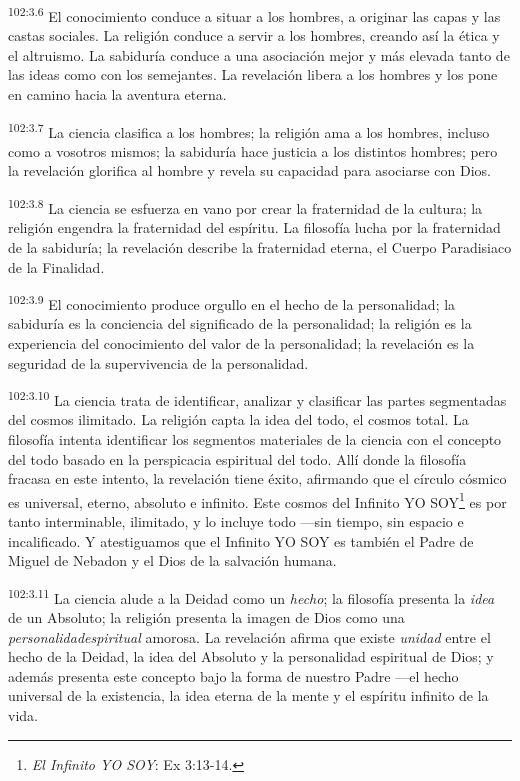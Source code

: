 \par
\textsuperscript{102:3.6} El conocimiento conduce a situar a los hombres, a originar las capas y las castas sociales. La religión conduce a servir a los hombres, creando así la ética y el altruismo. La sabiduría conduce a una asociación mejor y más elevada tanto de las ideas como con los semejantes. La revelación libera a los hombres y los pone en camino hacia la aventura eterna.

\par
\textsuperscript{102:3.7} La ciencia clasifica a los hombres; la religión ama a los hombres, incluso como a vosotros mismos; la sabiduría hace justicia a los distintos hombres; pero la revelación glorifica al hombre y revela su capacidad para asociarse con Dios.

\par
\textsuperscript{102:3.8} La ciencia se esfuerza en vano por crear la fraternidad de la cultura; la religión engendra la fraternidad del espíritu. La filosofía lucha por la fraternidad de la sabiduría; la revelación describe la fraternidad eterna, el Cuerpo Paradisiaco de la Finalidad.

\par
\textsuperscript{102:3.9} El conocimiento produce orgullo en el hecho de la personalidad; la sabiduría es la conciencia del significado de la personalidad; la religión es la experiencia del conocimiento del valor de la personalidad; la revelación es la seguridad de la supervivencia de la personalidad.

\par
\textsuperscript{102:3.10} La ciencia trata de identificar, analizar y clasificar las partes segmentadas del cosmos ilimitado. La religión capta la idea del todo, el cosmos total. La filosofía intenta identificar los segmentos materiales de la ciencia con el concepto del todo basado en la perspicacia espiritual del todo. Allí donde la filosofía fracasa en este intento, la revelación tiene éxito, afirmando que el círculo cósmico es universal, eterno, absoluto e infinito. Este cosmos del Infinito YO SOY\footnote{\textit{El Infinito YO SOY}: Ex 3:13-14.} es por tanto interminable, ilimitado, y lo incluye todo ---sin tiempo, sin espacio e incalificado. Y atestiguamos que el Infinito YO SOY es también el Padre de Miguel de Nebadon y el Dios de la salvación humana.

\par
\textsuperscript{102:3.11} La ciencia alude a la Deidad como un \textit{hecho}; la filosofía presenta la \textit{idea} de un Absoluto; la religión presenta la imagen de Dios como una \textit{personalidadespiritual} amorosa. La revelación afirma que existe \textit{unidad} entre el hecho de la Deidad, la idea del Absoluto y la personalidad espiritual de Dios; y además presenta este concepto bajo la forma de nuestro Padre ---el hecho universal de la existencia, la idea eterna de la mente y el espíritu infinito de la vida.

